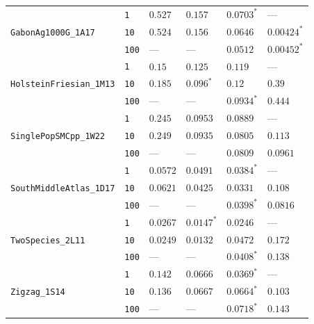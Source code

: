 \begin{footnotesize}
\begin{tabular}{llllll}
\multirow[c]{3}{*}{\texttt{GabonAg1000G\_1A17}} & \texttt{1} & $0.527$ & $0.157$ & $\mathbf{0.0703}^*$ & --- \\
 & \texttt{10} & $0.524$ & $0.156$ & $0.0646$ & $\mathbf{0.00424}^*$ \\
 & \texttt{100} & --- & --- & $0.0512$ & $\mathbf{0.00452}^*$ \\
\cline{1-6}
\multirow[c]{3}{*}{\texttt{HolsteinFriesian\_1M13}} & \texttt{1} & $0.15$ & $0.125$ & $\mathbf{0.119}$ & --- \\
 & \texttt{10} & $0.185$ & $\mathbf{0.096}^*$ & $0.12$ & $0.39$ \\
 & \texttt{100} & --- & --- & $\mathbf{0.0934}^*$ & $0.444$ \\
\cline{1-6}
\multirow[c]{3}{*}{\texttt{SinglePopSMCpp\_1W22}} & \texttt{1} & $0.245$ & $0.0953$ & $\mathbf{0.0889}$ & --- \\
 & \texttt{10} & $0.249$ & $0.0935$ & $\mathbf{0.0805}$ & $0.113$ \\
 & \texttt{100} & --- & --- & $\mathbf{0.0809}$ & $0.0961$ \\
\cline{1-6}
\multirow[c]{3}{*}{\texttt{SouthMiddleAtlas\_1D17}} & \texttt{1} & $0.0572$ & $0.0491$ & $\mathbf{0.0384}^*$ & --- \\
 & \texttt{10} & $0.0621$ & $0.0425$ & $\mathbf{0.0331}$ & $0.108$ \\
 & \texttt{100} & --- & --- & $\mathbf{0.0398}^*$ & $0.0816$ \\
\cline{1-6}
\multirow[c]{3}{*}{\texttt{TwoSpecies\_2L11}} & \texttt{1} & $0.0267$ & $\mathbf{0.0147}^*$ & $0.0246$ & --- \\
 & \texttt{10} & $0.0249$ & $\mathbf{0.0132}$ & $0.0472$ & $0.172$ \\
 & \texttt{100} & --- & --- & $\mathbf{0.0408}^*$ & $0.138$ \\
\cline{1-6}
\multirow[c]{3}{*}{\texttt{Zigzag\_1S14}} & \texttt{1} & $0.142$ & $0.0666$ & $\mathbf{0.0369}^*$ & --- \\
 & \texttt{10} & $0.136$ & $0.0667$ & $\mathbf{0.0664}^*$ & $0.103$ \\
 & \texttt{100} & --- & --- & $\mathbf{0.0718}^*$ & $0.143$ \\
\cline{1-6}
\bottomrule
\end{tabular}
\end{footnotesize}
